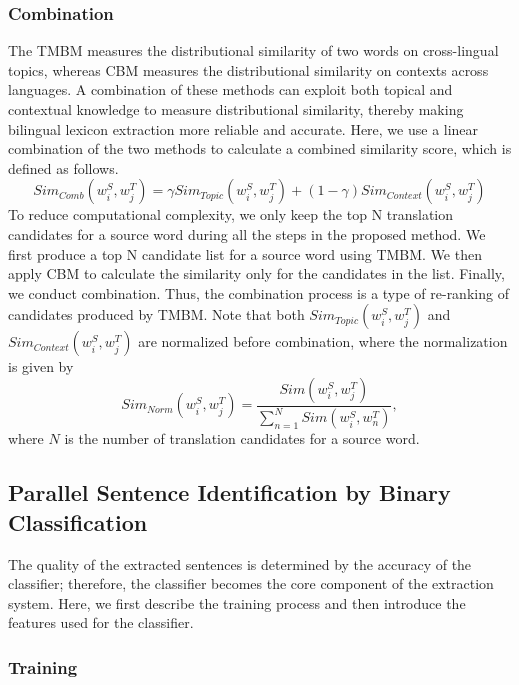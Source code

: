 \documentclass[english]{jnlp_1.4}
\begin{document}
\subsubsection{Combination}
\label{lexicon_sec:combination}

The TMBM measures the distributional similarity of two words on cross-lingual 
topics, whereas CBM measures the distributional similarity on contexts across 
languages. A combination of these methods can exploit both topical and contextual 
knowledge to measure distributional similarity, thereby making bilingual lexicon 
extraction more reliable and accurate. Here, we use a linear combination of the 
two methods to calculate a combined similarity score, which is defined as follows.
\begin{equation}
Sim_{Comb}(w_i^S, w_j^T)=\gamma{Sim_{Topic}(w_i^S, w_j^T)}+(1-\gamma){Sim_{Context}(w_i^S, w_j^T)}
\end{equation}
To reduce computational complexity, we only keep the top N translation
candidates for a source word during all the steps in the proposed method. We
first produce a top N candidate list for a source word using TMBM. We then
apply CBM to calculate the similarity only for the candidates in the
list. Finally, we conduct
combination. Thus, the combination process is a type of re-ranking
of candidates produced by TMBM. Note that
both $Sim_{Topic}(w_i^S, w_j^T)$ and $Sim_{Context}(w_i^S, w_j^T)$ are
normalized before combination, where the normalization is given by
\begin{equation}
Sim_{Norm}(w_i^S, w_j^T)=\frac{Sim(w_i^S, w_j^T)}{\sum_{n=1}^{N}Sim(w_i^S, w_n^T)},
\end{equation}
where $N$ is the number of translation candidates for a source word.


\subsection{Parallel Sentence Identification by Binary Classification}
\label{sentence_sec:classification}

The quality of the extracted sentences is determined by the accuracy of the classifier; 
therefore, the classifier becomes the core component of the extraction system. Here, we 
first describe the training process and then introduce the features used for the classifier.


\subsubsection{Training}
\end{document}
